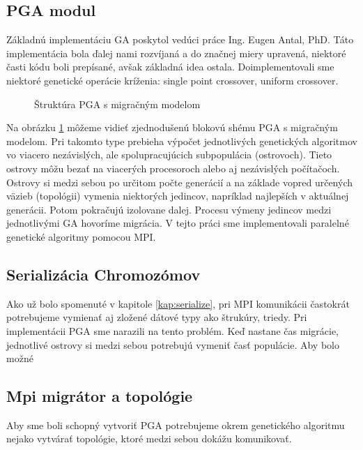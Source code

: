 \subsection{PGA modul}
Základnú implementáciu GA poskytol vedúci práce Ing. Eugen Antal, PhD.
Táto implementácia bola ďalej nami rozvíjaná a do značnej miery upravená, niektoré časti kódu boli prepísané, avšak základná idea ostala.
Doimplementovali sme niektoré genetické operácie kríženia: single point crossover, uniform crossover.

\begin{figure}[!htbp]
  \centering
  
  \caption{Štruktúra PGA s migračným modelom}
  \label{img:pga}
\end{figure}

Na obrázku \ref{img:pga} môžeme vidieť zjednodušenú blokovú shému PGA s migračným modelom.
Pri takomto type prebieha výpočet jednotlivých genetických algoritmov vo viacero nezávislých, ale spolupracujúcich subpopulácia (ostrovoch).
Tieto ostrovy môžu bezať na viacerých procesoroch alebo aj nezávislých počítačoch.
Ostrovy si medzi sebou po určitom počte generácií a na základe vopred určených väzieb (topológii) vymenia niektorých jedincov,
napríklad najlepších v aktuálnej generácii. Potom pokračujú izolovane dalej.
Procesu výmeny jedincov medzi jednotlivými GA hovoríme migrácia.
V tejto práci sme implementovali paralelné genetické algoritmy pomocou MPI.



\subsection{Serializácia Chromozómov}
Ako už bolo spomenuté v kapitole \ref{kap:serialize}, pri MPI komunikácii častokrát potrebujeme vymienať aj zložené dátové typy ako štrukúry, triedy.
Pri implementácii PGA sme narazili na tento problém. Keď nastane čas migrácie, jednotlivé ostrovy si medzi sebou potrebujú vymeniť časť populácie.
Aby bolo možné 

\subsection{Mpi migrátor a topológie}
Aby sme boli schopný vytvoriť PGA potrebujeme okrem genetického algoritmu nejako vytvárať topológie, ktoré medzi sebou dokážu komunikovať.

